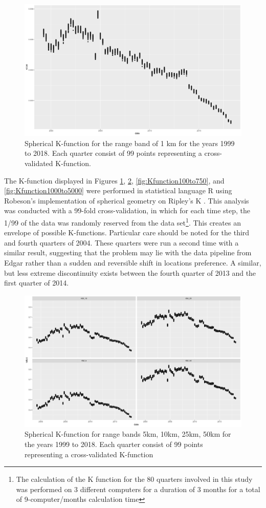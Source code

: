 \begin{figure}[h]
	\centering
	\includegraphics[width=.9\textwidth]{Figures/ChapterIII/Cross_Val_1k.pdf} 
	\caption[Spherical K-function for Range Band 1km]{Spherical K-function for the range band of 1 km for the years 1999 to 2018.  Each quarter consist of 99 points representing a cross-validated K-function.}
	\label{fig:Kfunction1}
\end{figure}
The K-function displayed in Figures \ref{fig:Kfunction1}, \ref{fig:Kfunction5to100}, \ref{fig:Kfunction100to750}, and \ref{fig:Kfunction1000to5000} were performed in statistical language R using Robeson's implementation of spherical geometry on Ripley's K \citep{SphericalK}.  This analysis was conducted with a 99-fold cross-validation, in which for each time step, the 1/99 of the data was randomly reserved from the data set\footnote{The calculation of the K function for the 80 quarters involved in this study was performed on 3 different computers for a duration of 3 months for a total of 9-computer/months calculation time}.  This creates an envelope of possible K-functions. Particular care should be noted for the third and fourth quarters of 2004.  These quarters were run a second time with a similar result, suggesting that the problem may lie with the data pipeline from Edgar rather than a sudden and reversible shift in locations preference. A similar, but less extreme discontinuity exists between the fourth quarter of 2013 and the first quarter of 2014. 
\begin{figure}[h]
	\centering
	\includegraphics[width=.9\textwidth]{Figures/ChapterIII/K_Function_5to50.pdf} 
	\caption[Spherical K-function for Range Bands 5km to 50km]{Spherical K-function for range bands 5km, 10km, 25km, 50km for the years 1999 to 2018. Each quarter consist of 99 points representing a cross-validated K-function}
	\label{fig:Kfunction5to100}
\end{figure}
